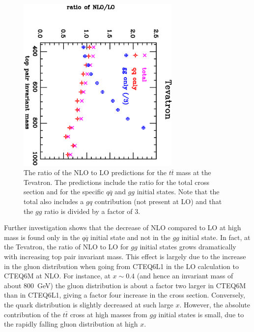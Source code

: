 \documentclass[12pt]{iopart}
\begin{document}
%
\begin{figure}[t]
\begin{center}
\includegraphics[width=8cm,angle=90]{mtt_ratio_tev.ps}
\end{center}
\vspace*{-0.5cm}
\caption{
The ratio of the NLO to LO predictions for the $t\overline{t}$ mass at the Tevatron.
The predictions include the ratio for the total cross section and for the
specific $q\overline{q}$ and $gg$ initial states. Note that the total also includes a $gq$ contribution
(not present at LO) and that the $gg$ ratio is divided by a factor of $3$.  
\label{fig:mtt_ratio_tev}}
\end{figure}
%

Further investigation shows that the decrease of NLO compared to LO at high mass is found only in the
$q\overline{q}$ initial state and not in the $gg$ initial state. In fact, at the Tevatron, the ratio of NLO to LO for $gg$ initial states grows dramatically
with increasing top pair invariant mass. This effect is largely due to the increase in the gluon
distribution when going from CTEQ6L1 in the LO calculation to CTEQ6M at NLO. For instance, at $x \sim 0.4$ (and hence an invariant
mass of about $800$~GeV) the gluon distribution is about a factor two larger in CTEQ6M than in CTEQ6L1, giving a factor four
increase in the cross section. Conversely, the quark distribution is slightly decreased at such large $x$. However, the absolute contribution of the $t\bar{t}$ cross at high masses from $gg$ initial states is small, due to the rapidly falling gluon distribution at high $x$. 
\end{document}
